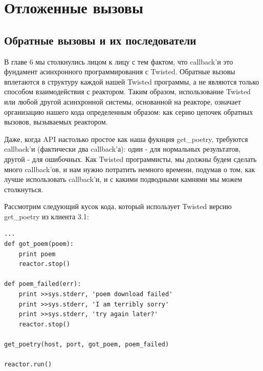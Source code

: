 

\section{Отложенные вызовы\label{sec:part7}}

\subsection{Обратные вызовы и их последователи}

В главе 6 мы столкнулись лицом к лицу с тем фактом, что 
callback'и это фундамент асинхронного программирования с Twisted. 
Обратные вызовы вплетаются в структуру каждой нашей 
Twisted программы, а не являются только способом взаимодействия с 
реактором. Таким образом, использование Twisted 
или любой другой асинхронной системы, основанной на реакторе, 
означает организацию нашего кода определенным образом: 
как серию цепочек обратных вызовов, вызываемых реактором.
 

Даже, когда API настолько простое как наша фукнция get\_poetry, 
требуются callback'и (фактически два callback'а): один - для нормальных 
результатов, другой - для ошибочных. Как Twisted программисты, 
мы должны будем сделать много callback'ов, и нам нужно потратить 
немного времени, подумав о том, как лучше использовать callback'и, и 
с какими подводными камнями мы можем столкнуться.


Рассмотрим следующий кусок кода, который использует 
Twisted версию get\_poetry из клиента 3.1:

\begin{scriptsize}\begin{verbatim}
...
def got_poem(poem):
    print poem
    reactor.stop()

def poem_failed(err):
    print >>sys.stderr, 'poem download failed'
    print >>sys.stderr, 'I am terribly sorry'
    print >>sys.stderr, 'try again later?'
    reactor.stop()

get_poetry(host, port, got_poem, poem_failed)

reactor.run()
\end{verbatim}\end{scriptsize}

